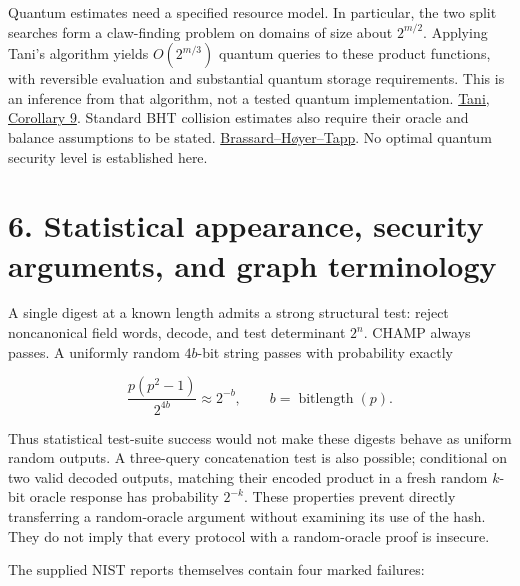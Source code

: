 \documentclass[
  english,
  11pt,
  a4paper,
]{article}
\begin{document}
Quantum estimates need a specified resource model. In particular, the
two split searches form a claw-finding problem on domains of size about
\(2^{m/2}\). Applying Tani's algorithm yields \(O(2^{m/3})\) quantum
queries to these product functions, with reversible evaluation and
substantial quantum storage requirements. This is an inference from that
algorithm, not a tested quantum implementation.
\href{https://arxiv.org/abs/0708.2584}{Tani, Corollary 9}. Standard BHT
collision estimates also require their oracle and balance assumptions to
be stated.
\href{https://arxiv.org/abs/quant-ph/9705002}{Brassard--Høyer--Tapp}. No
optimal quantum security level is established here.



\section{6. Statistical appearance, security arguments, and graph
terminology}\label{statistical-appearance-security-arguments-and-graph-terminology}


A single digest at a known length admits a strong structural test:
reject noncanonical field words, decode, and test determinant \(2^n\).
CHAMP always passes. A uniformly random \(4b\)-bit string passes with
probability exactly

\[
\frac{p(p^2-1)}{2^{4b}}\approx 2^{-b},\qquad b=\operatorname{bitlength}(p).
\]

Thus statistical test-suite success would not make these digests behave
as uniform random outputs. A three-query concatenation test is also
possible; conditional on two valid decoded outputs, matching their
encoded product in a fresh random \(k\)-bit oracle response has
probability \(2^{-k}\). These properties prevent directly transferring a
random-oracle argument without examining its use of the hash. They do
not imply that every protocol with a random-oracle proof is insecure.

The supplied NIST reports themselves contain four marked failures:

\end{document}
